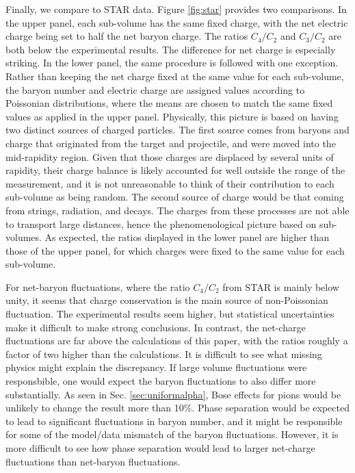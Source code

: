 {Finally, we compare to STAR data. Figure \ref{fig:star} provides two comparisons. In the upper panel, each sub-volume has the same fixed charge, with the net electric charge being set to half the net baryon charge. The ratios $C_4/C_2$ and $C_3/C_2$ are both below the experimental results. The difference for net charge is especially striking. In the lower panel, the same procedure is followed with one exception. Rather than keeping the net charge fixed at the same value for each sub-volume, the baryon number and electric charge are assigned values according to Poissonian distributions, where the means are chosen to match the same fixed values as applied in the upper panel. Physically, this picture is based on having two distinct sources of charged particles. The first source comes from baryons and charge that originated from the target and projectile, and were moved into the mid-rapidity region. Given that those charges are displaced by several units of rapidity, their charge balance is likely accounted for well outside the range of the measurement, and it is not unreasonable to think of their contribution to each sub-volume as being random. The second source of charge would be that coming from strings, radiation, and decays. The charges from these processes are not able to transport large distances, hence the phenomenological picture based on sub-volumes. As expected, the ratios displayed in the lower panel are higher than those of the upper panel, for which charges were fixed to the same value for each sub-volume.

For net-baryon fluctuations, where the ratio $C_4/C_2$ from STAR is mainly below unity, it seems that charge conservation is the main source of non-Poissonian fluctuation. The experimental results seem higher, but statistical uncertainties make it difficult to make strong conclusions. In contrast, the net-charge fluctuations are far above the calculations of this paper, with the ratios roughly a factor of two higher than the calculations. It is difficult to see what missing physics might explain the discrepancy. If large volume fluctuations were responsbible, one would expect the baryon fluctuations to also differ more substantially. As seen in Sec. \ref{sec:uniformalpha}, Bose effects for pions would be unlikely to change the result more than 10\%. Phase separation would be expected to lead to significant fluctuations in baryon number, and it might be responsible for some of the model/data mismatch of the baryon fluctuations. However, it is more difficult to see how phase separation would lead to larger net-charge fluctuations than net-baryon fluctuations.

}
